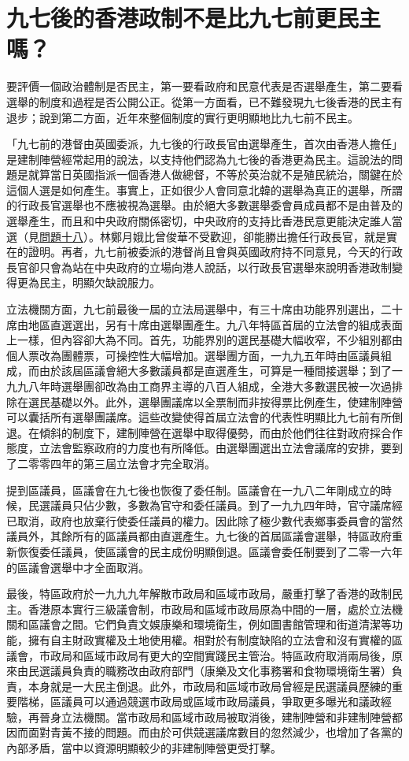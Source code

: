 \section{九七後的香港政制不是比九七前更民主嗎？}
\label{sec:sec33}

要評價一個政治體制是否民主，第一要看政府和民意代表是否選舉產生，第二要看選舉的制度和過程是否公開公正。從第一方面看，已不難發現九七後香港的民主有退步；說到第二方面，近年來整個制度的實行更明顯地比九七前不民主。

「九七前的港督由英國委派，九七後的行政長官由選舉產生，首次由香港人擔任」是建制陣營經常起用的說法，以支持他們認為九七後的香港更為民主。這說法的問題是就算當日英國指派一個香港人做總督，不等於英治就不是殖民統治，關鍵在於這個人選是如何產生。事實上，正如很少人會同意北韓的選舉為真正的選舉，所謂的行政長官選舉也不應被視為選舉。由於絕大多數選舉委會員成員都不是由普及的選舉產生，而且和中央政府關係密切，中央政府的支持比香港民意更能決定誰人當選（見\hyperref[sec:sec18]{問題十八}）。林鄭月娥比曾俊華不受歡迎，卻能勝出擔任行政長官，就是實在的證明。再者，九七前被委派的港督尚且會與英國政府持不同意見，今天的行政長官卻只會為站在中央政府的立場向港人說話，以行政長官選舉來說明香港政制變得更為民主，明顯欠缺說服力。

立法機關方面，九七前最後一屆的立法局選舉中，有三十席由功能界別選出，二十席由地區直選選出，另有十席由選舉團產生。九八年特區首屆的立法會的組成表面上一樣，但內容卻大為不同。首先，功能界別的選民基礎大幅收窄，不少組別都由個人票改為團體票，可操控性大幅增加。選舉團方面，一九九五年時由區議員組成，而由於該屆區議會絕大多數議員都是直選產生，可算是一種間接選舉；到了一九九八年時選舉團卻改為由工商界主導的八百人組成，全港大多數選民被一次過排除在選民基礎以外。此外，選舉團議席以全票制而非按得票比例產生，使建制陣營可以囊括所有選舉團議席。這些改變使得首屆立法會的代表性明顯比九七前有所倒退。在傾斜的制度下，建制陣營在選舉中取得優勢，而由於他們往往對政府採合作態度，立法會監察政府的力度也有所降低。由選舉團選出立法會議席的安排，要到了二零零四年的第三屆立法會才完全取消。

提到區議員，區議會在九七後也恢復了委任制。區議會在一九八二年剛成立的時候，民選議員只佔少數，多數為官守和委任議員。到了一九九四年時，官守議席經已取消，政府也放棄行使委任議員的權力。因此除了極少數代表鄉事委員會的當然議員外，其餘所有的區議員都由直選產生。九七後的首屆區議會選舉，特區政府重新恢復委任議員，使區議會的民主成份明顯倒退。區議會委任制要到了二零一六年的區議會選舉中才全面取消。

最後，特區政府於一九九九年解散市政局和區域市政局，嚴重打擊了香港的政制民主。香港原本實行三級議會制，市政局和區域市政局原為中間的一層，處於立法機關和區議會之間。它們負責文娛康樂和環境衛生，例如圖書館管理和街道清潔等功能，擁有自主財政實權及土地使用權。相對於有制度缺陷的立法會和沒有實權的區議會，市政局和區域市政局有更大的空間實踐民主管治。特區政府取消兩局後，原來由民選議員負責的職務改由政府部門（康樂及文化事務署和食物環境衛生署）負責，本身就是一大民主倒退。此外，市政局和區域市政局曾經是民選議員歷練的重要階梯，區議員可以通過競選市政局或區域市政局議員，爭取更多曝光和議政經驗，再晉身立法機關。當市政局和區域市政局被取消後，建制陣營和非建制陣營都因而面對青黃不接的問題。而由於可供競選議席數目的忽然減少，也增加了各黨的內部矛盾，當中以資源明顯較少的非建制陣營更受打擊。


